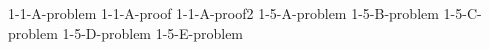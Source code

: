 \documentclass[uplatex, dvipdfmx, a4paper, 12pt, class=jsarticle, crop=false]{standalone}
\begin{document}
	{1-1-A-problem}
	{1-1-A-proof}
	{1-1-A-proof2}
	{1-5-A-problem}
	{1-5-B-problem}
	{1-5-C-problem}
	{1-5-D-problem}
	{1-5-E-problem}
\end{document}
